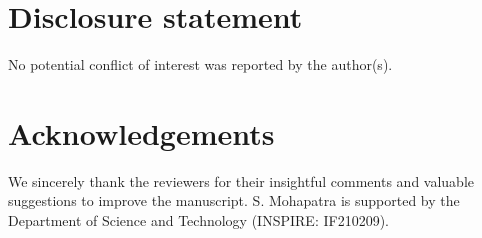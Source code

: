 \documentclass[12pt,a4paper]{article}
\newtheorem{exm}{Example}
\def \u {{\bf u}}
\def \v {{\bf v}}
\begin{document}
 
 
 
 \section*{Disclosure statement}
  No potential conflict of interest was reported by the author(s).


 
\section*{Acknowledgements}
 We sincerely thank the reviewers for their insightful comments and valuable suggestions to improve the manuscript. 
S. Mohapatra is supported by the Department of Science and Technology (INSPIRE: IF210209).




\end{document}

